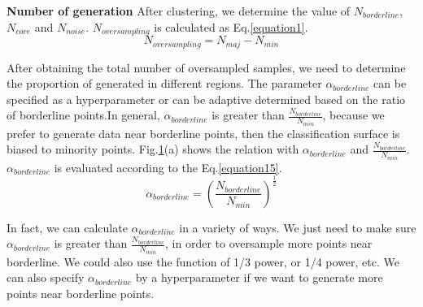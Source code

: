 \documentclass[ida]{iosart2x}
\begin{document}
\textbf{Number of generation} After clustering, 
we determine the value of $N_{borderline}$, 
$N_{core}$ and $N_{noise}$. 
$N_{oversampling}$ is calculated as Eq.\ref{equation1}.
\begin{equation}
  \label{equation1}
  N_{oversampling}=N_{maj}-N_{min}
\end{equation}

After obtaining the total number of oversampled samples, 
we need to determine the proportion of generated 
in different regions.
The parameter $\alpha_{borderline}$ can be specified as a hyperparameter or can be adaptive determined based on the ratio of borderline points.In general, $\alpha_{borderline}$ is greater than $\frac{N_{borderline}}{N_{min}}$,
because we prefer to generate data near borderline points,
then the classification surface is biased to minority points.
Fig.\ref{fig20}(a) shows the relation with $\alpha_{borderline}$ and $\frac{N_{borderline}}{N_{min}}$.
$\alpha_{borderline}$ is evaluated according to the Eq.\ref{equation15}.
\begin{equation}
  \label{equation15}
  \alpha_{borderline}=(\frac{N_{borderline}}{N_{min}})^{\frac{1}{2}}
\end{equation}

In fact, we can calculate $\alpha_{borderline}$ in a variety of ways. 
We just need to make sure $\alpha_{borderline}$ is greater 
than $\frac{N_{borderline}}{N_{min}}$, in order
to oversample more points near borderline. 
We could also use the function of 1/3 power, or 1/4 power, etc.
We can also specify $\alpha_{borderline}$ by a hyperparameter
if we want to generate more points near borderline points.
\begin{figure}[tb]
  \centering
  \quad
  \caption{}
  \label{fig20}
  \end{figure}
\end{document}
